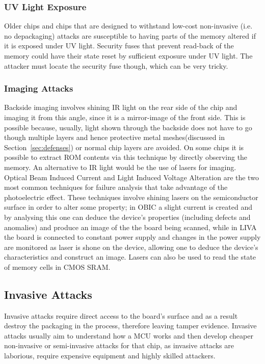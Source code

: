 	\subsubsection{UV Light Exposure}
	Older chips and chips that are designed to withstand low-cost non-invasive (i.e. no depackaging) attacks are susceptible to having parts of the memory altered if it is exposed under UV light. Security fuses that prevent read-back of the memory could have their state reset by sufficient exposure under UV light. The attacker must locate the security fuse though, which can be very tricky. 

	\subsubsection{Imaging Attacks}
	Backside imaging involves shining IR light on the rear side of the chip and imaging it from this angle, since it is a mirror-image of the front side. This is possible because, usually, light shown through the backside does not have to go though multiple layers and hence protective metal meshes(discussed in Section~\ref{sec:defenses}) or normal chip layers are avoided. On some chips it is possible to extract ROM contents via this technique by directly observing the memory. An alternative to IR light would be the use of lasers for imaging. Optical Beam Induced Current and Light Induced Voltage Alteration are the two most common techniques for failure analysis that take advantage of the photoelectric effect. These techniques involve shining lasers on the semiconductor surface in order to alter some property; in OBIC a slight current is created and by analysing this one can deduce the device's properties (including defects and anomalies) and produce an image of the the board being scanned, while in LIVA the board is connected to constant power supply and changes in the power supply are monitored as laser is shone on the device, allowing one to deduce the device's characteristics and construct an image\citep{cole:OBIC}. Lasers can also be used to read the state of memory cells in CMOS SRAM\citep{sergei:thesis}.
	
	\subsection{Invasive Attacks}
	Invasive attacks require direct access to the board's surface and as a result destroy the packaging in the process, therefore leaving tamper evidence\citep{sergei:thesis}\citep{hwre}. Invasive attacks usually aim to understand how a MCU works and then develop cheaper non-invasive or semi-invasive attacks for that chip, as invasive attacks are laborious, require expensive equipment and highly skilled attackers\citep{sergei:thesis}.
	
